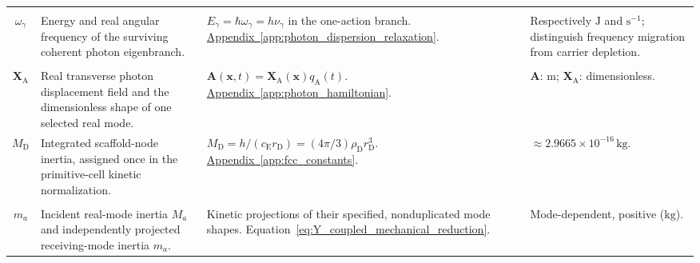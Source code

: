\begin{longtable}{@{} c p{5.5cm} p{4cm} p{3.5cm} @{}}
\begin{tabular}[c]{@{}c@{}}$E_\gamma$ \\ $\omega_\gamma$\end{tabular} & {\raggedright Energy and real angular frequency of the surviving coherent photon eigenbranch.\par} & {\raggedright $E_\gamma=\hbar\omega_\gamma=h\nu_\gamma$ in the one-action branch. \newline \hyperref[app:photon_dispersion_relaxation]{Appendix~\ref*{app:photon_dispersion_relaxation}}.\par} & {\raggedright Respectively $\mathrm J$ and $\mathrm{s^{-1}}$; distinguish frequency migration from carrier depletion.\par} \\

\begin{tabular}[c]{@{}c@{}}$\mathbf A$ \\ $\mathbf X_{\mathrm A}$\end{tabular} & {\raggedright Real transverse photon displacement field and the dimensionless shape of one selected real mode.\par} & {\raggedright $\mathbf A(\mathbf x,t)=\mathbf X_{\mathrm A}(\mathbf x)q_{\mathrm A}(t)$. \newline \hyperref[app:photon_hamiltonian]{Appendix~\ref*{app:photon_hamiltonian}}.\par} & {\raggedright $\mathbf A$: $\mathrm m$; $\mathbf X_{\mathrm A}$: dimensionless.\par} \\


$M_{\mathrm D}$ & {\raggedright Integrated scaffold-node inertia, assigned once in the primitive-cell kinetic normalization.\par} & {\raggedright $M_{\mathrm D}=h/(c_{\mathrm E}r_{\mathrm D})=(4\pi/3)\rho_{\mathrm D}r_{\mathrm D}^3$. \newline \hyperref[app:fcc_constants]{Appendix~\ref*{app:fcc_constants}}.\par} & {\raggedright $\approx2.9665\times10^{-16}\,\mathrm{kg}$.\par} \\

\begin{tabular}[c]{@{}c@{}}$M_a$ \\ $m_a$\end{tabular} & {\raggedright Incident real-mode inertia $M_a$ and independently projected receiving-mode inertia $m_a$.\par} & {\raggedright Kinetic projections of their specified, nonduplicated mode shapes. \newline Equation~\eqref{eq:Y_coupled_mechanical_reduction}.\par} & {\raggedright Mode-dependent, positive ($\mathrm{kg}$).\par} \\


\end{longtable}
